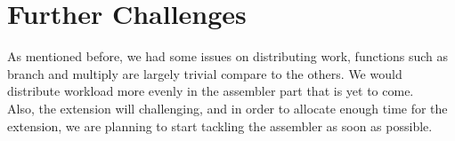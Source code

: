 \documentclass[11pt]{article}
\begin{document}
\section{Further Challenges}
As mentioned before, we had some issues on distributing work, functions such as branch and multiply are largely trivial compare to the others. We would distribute workload more evenly in the assembler part that is yet to come.\\
Also, the extension will challenging, and in order to allocate enough time for the extension, we are planning to start tackling the assembler as soon as possible.
\end{document}
